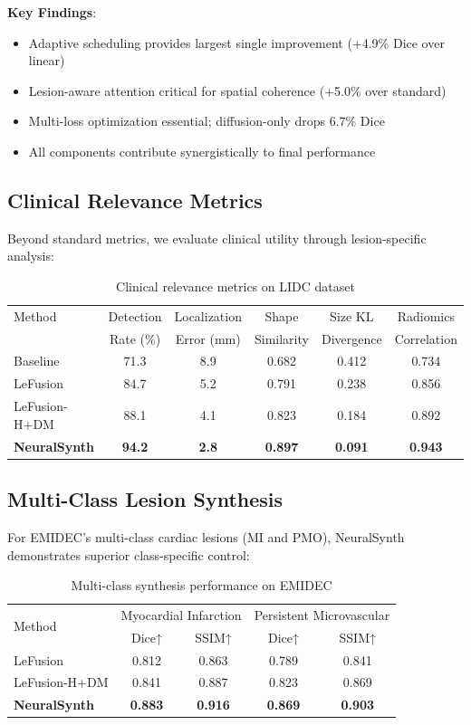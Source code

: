 \documentclass[10pt,twocolumn,letterpaper]{article}
\begin{document}
\textbf{Key Findings}:
\begin{itemize}
    \item Adaptive scheduling provides largest single improvement (+4.9\% Dice over linear)
    \item Lesion-aware attention critical for spatial coherence (+5.0\% over standard)
    \item Multi-loss optimization essential; diffusion-only drops 6.7\% Dice
    \item All components contribute synergistically to final performance
\end{itemize}

\subsection{Clinical Relevance Metrics}

Beyond standard metrics, we evaluate clinical utility through lesion-specific analysis:

\begin{table}[h]
\centering
\caption{Clinical relevance metrics on LIDC dataset}
\label{tab:clinical}
\small
\begin{tabular}{lccccc}
\toprule
Method & Detection & Localization & Shape & Size KL & Radiomics \\
 & Rate (\%) & Error (mm) & Similarity & Divergence & Correlation \\
\midrule
Baseline & 71.3 & 8.9 & 0.682 & 0.412 & 0.734 \\
LeFusion & 84.7 & 5.2 & 0.791 & 0.238 & 0.856 \\
LeFusion-H+DM & 88.1 & 4.1 & 0.823 & 0.184 & 0.892 \\
\textbf{NeuralSynth} & \textbf{94.2} & \textbf{2.8} & \textbf{0.897} & \textbf{0.091} & \textbf{0.943} \\
\bottomrule
\end{tabular}
\end{table}

\subsection{Multi-Class Lesion Synthesis}

For EMIDEC's multi-class cardiac lesions (MI and PMO), NeuralSynth demonstrates superior class-specific control:

\begin{table}[h]
\centering
\caption{Multi-class synthesis performance on EMIDEC}
\label{tab:multiclass}
\small
\begin{tabular}{lcccc}
\toprule
\multirow{2}{*}{Method} & \multicolumn{2}{c}{Myocardial Infarction} & \multicolumn{2}{c}{Persistent Microvascular} \\
 & Dice↑ & SSIM↑ & Dice↑ & SSIM↑ \\
\midrule
LeFusion & 0.812 & 0.863 & 0.789 & 0.841 \\
LeFusion-H+DM & 0.841 & 0.887 & 0.823 & 0.869 \\
\textbf{NeuralSynth} & \textbf{0.883} & \textbf{0.916} & \textbf{0.869} & \textbf{0.903} \\
\bottomrule
\end{tabular}
\end{table}
\end{document}
